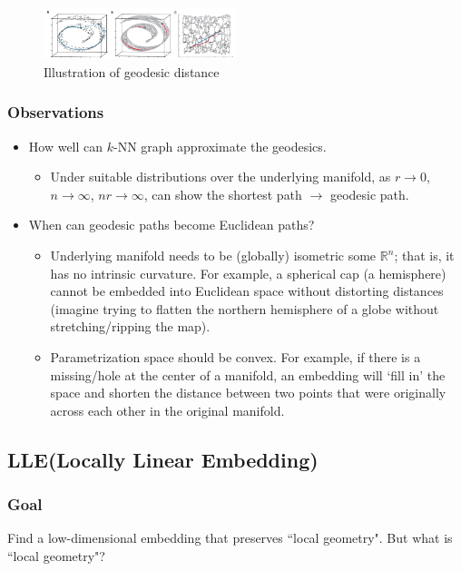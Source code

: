 \begin{figure}
\centering
\includegraphics[width=0.5\textwidth]{chapter_7/files/isomap.png}
\caption{Illustration of geodesic distance}
\end{figure}

\subsubsection*{Observations}
\begin{itemize}
\item How well can $k$-NN graph approximate the geodesics.
  \begin{itemize}
  \item Under suitable distributions over the underlying    manifold,
    as $r\rightarrow 0$, $n\rightarrow \infty$, $nr \rightarrow
    \infty$, can show the shortest path $\rightarrow$ geodesic path. 
  \end{itemize}
\item When can geodesic paths become Euclidean paths?
  \begin{itemize}
  \item Underlying manifold needs to be (globally) isometric some
    $\mathbb{R}^n$; that is, it has no intrinsic curvature. For
    example, a spherical cap (a hemisphere) cannot be embedded into
    Euclidean space without distorting distances (imagine trying to
    flatten the northern hemisphere of a globe without
    stretching/ripping the map).  
  \item Parametrization space should be convex. For example, if there
    is a missing/hole at the center of a manifold, an embedding will
    `fill in' the space and shorten the distance between two points
    that were originally across each other in the original manifold. 
  \end{itemize}
\end{itemize}


\subsection{LLE(Locally Linear Embedding)}
\subsubsection*{Goal}
Find a low-dimensional embedding that preserves ``local geometry". But
what is ``local geometry"? 

